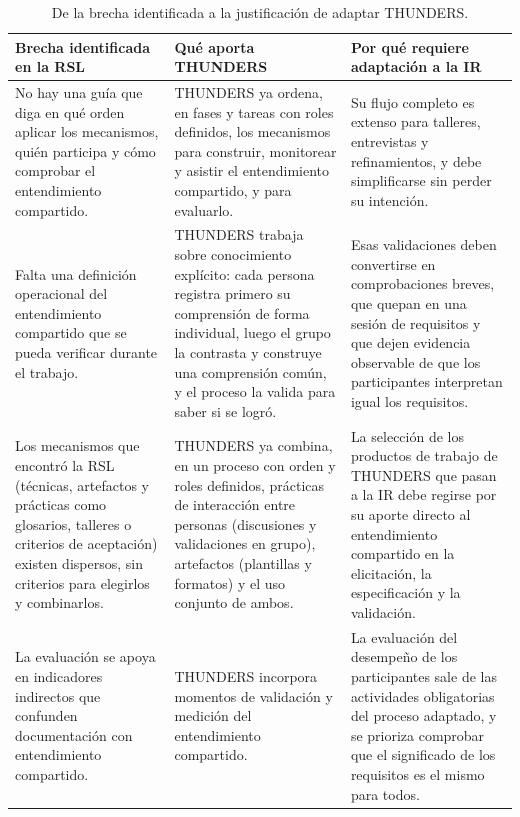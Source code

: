 \documentclass[12pt,letterpaper,oneside]{report}
\begin{document}
\begin{table}[H]
\caption{De la brecha identificada a la justificación de adaptar THUNDERS.}
\label{tab:gap_adaptation}
\centering
\footnotesize
\renewcommand{\arraystretch}{1.15}
\begin{tabularx}{\textwidth}{@{}L{4.2cm}Y Y@{}}
\toprule
\textbf{Brecha identificada en la RSL} & \textbf{Qué aporta THUNDERS} &
\textbf{Por qué requiere adaptación a la IR} \\
\midrule
No hay una guía que diga en qué orden aplicar los mecanismos, quién participa y
cómo comprobar el entendimiento compartido. &
THUNDERS ya ordena, en fases y tareas con roles definidos, los mecanismos para
construir, monitorear y asistir el entendimiento compartido, y para evaluarlo. &
Su flujo completo es extenso para talleres, entrevistas y refinamientos, y debe
simplificarse sin perder su intención. \\
\midrule
Falta una definición operacional del entendimiento compartido que se pueda
verificar durante el trabajo. &
THUNDERS trabaja sobre conocimiento explícito: cada persona registra primero
su comprensión de forma individual, luego el grupo la contrasta y construye una
comprensión común, y el proceso la valida para saber si se logró. &
Esas validaciones deben convertirse en comprobaciones breves, que quepan en una
sesión de requisitos y que dejen evidencia observable de que los participantes
interpretan igual los requisitos. \\
\midrule
Los mecanismos que encontró la RSL (técnicas, artefactos y prácticas como
glosarios, talleres o criterios de aceptación) existen dispersos, sin criterios
para elegirlos y combinarlos. &
THUNDERS ya combina, en un proceso con orden y roles definidos, prácticas de
interacción entre personas (discusiones y validaciones en grupo), artefactos
(plantillas y formatos) y el uso conjunto de ambos. &
La selección de los productos de trabajo de THUNDERS que pasan a la IR debe regirse por
su aporte directo al entendimiento compartido en la elicitación, la
especificación y la validación. \\
\midrule
La evaluación se apoya en indicadores indirectos que confunden documentación con
entendimiento compartido. &
THUNDERS incorpora momentos de validación y medición del entendimiento compartido. &
La evaluación del desempeño de los participantes sale de las actividades
obligatorias del proceso adaptado, y se prioriza comprobar que el significado
de los requisitos es el mismo para todos. \\
\bottomrule
\end{tabularx}
\end{table}
\end{document}
